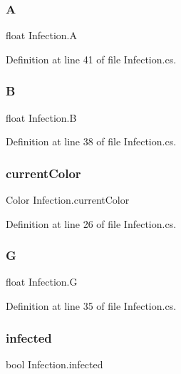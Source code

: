 \subsubsection{\texorpdfstring{A}{A}}
{\footnotesize\ttfamily float Infection.\+A}



Definition at line 41 of file Infection.\+cs.

\hypertarget{class_infection_a8fcb6741aa0001114773110539cd9a7a}{}\label{class_infection_a8fcb6741aa0001114773110539cd9a7a} 
\subsubsection{\texorpdfstring{B}{B}}
{\footnotesize\ttfamily float Infection.\+B}



Definition at line 38 of file Infection.\+cs.

\hypertarget{class_infection_ad3af6c8327fa2602602441aef959bb8f}{}\label{class_infection_ad3af6c8327fa2602602441aef959bb8f} 
\subsubsection{\texorpdfstring{current\+Color}{currentColor}}
{\footnotesize\ttfamily Color Infection.\+current\+Color}



Definition at line 26 of file Infection.\+cs.

\hypertarget{class_infection_ab3534c9042ed3248a3179d6d3884bf9f}{}\label{class_infection_ab3534c9042ed3248a3179d6d3884bf9f} 
\subsubsection{\texorpdfstring{G}{G}}
{\footnotesize\ttfamily float Infection.\+G}



Definition at line 35 of file Infection.\+cs.

\hypertarget{class_infection_ad4b2065e411b4aacb19f2f7ccd32cb47}{}\label{class_infection_ad4b2065e411b4aacb19f2f7ccd32cb47} 
\subsubsection{\texorpdfstring{infected}{infected}}
{\footnotesize\ttfamily bool Infection.\+infected}



